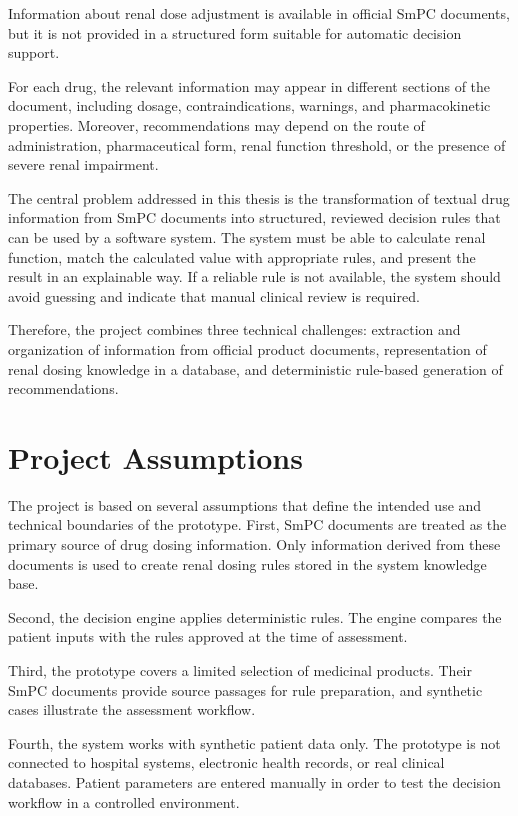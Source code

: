 \documentclass[12pt,a4paper,twoside]{book}
\begin{document}
Information about renal dose adjustment is available in official SmPC documents, but it is not provided in a structured form suitable for automatic decision support.

For each drug, the relevant information may appear in different sections of the document, including dosage, contraindications, warnings, and pharmacokinetic properties. 
Moreover, recommendations may depend on the route of administration, pharmaceutical form, renal function threshold, or the presence of severe renal impairment.

The central problem addressed in this thesis is the transformation of textual drug information from SmPC documents into structured, reviewed decision rules that can be used by a software system. 
The system must be able to calculate renal function, match the calculated value with appropriate rules, and present the result in an explainable way. 
If a reliable rule is not available, the system should avoid guessing and indicate that manual clinical review is required.

Therefore, the project combines three technical challenges: extraction and organization of information from official product documents, representation of renal dosing knowledge in a database, and deterministic rule-based generation of recommendations.

\section{Project Assumptions}\label{sec:project-assumptions}

The project is based on several assumptions that define the intended use and technical boundaries of the prototype. 
First, SmPC documents are treated as the primary source of drug dosing information. 
Only information derived from these documents is used to create renal dosing rules stored in the system knowledge base.

Second, the decision engine applies deterministic rules.
The engine compares the patient inputs with the rules approved at the time of assessment.

Third, the prototype covers a limited selection of medicinal products.
Their SmPC documents provide source passages for rule preparation, and synthetic cases illustrate the assessment workflow.

Fourth, the system works with synthetic patient data only. 
The prototype is not connected to hospital systems, electronic health records, or real clinical databases. 
Patient parameters are entered manually in order to test the decision workflow in a controlled environment.
\end{document}
